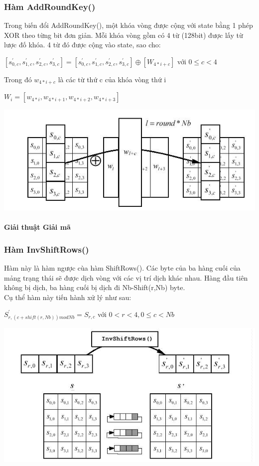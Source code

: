 \documentclass[paper=a4, fontsize=11pt]{scrartcl}	%
\numberwithin{equation}{section}															%
\numberwithin{figure}{section}																%
\numberwithin{table}{section}																%
\begin{document}
		\subsubsection{Hàm AddRoundKey()}
		Trong biến đổi AddRoundKey(), một khóa vòng được cộng với state bằng 1 phép XOR theo từng bit đơn giản. Mỗi khóa vòng gồm có 4 từ (128bit) được lấy từ lược đố khóa. 4 từ đó được cộng vào state, sao cho:
		\begin{center}
		$[s^{'}_{0,c},s^{'}_{1,c},s^{'}_{2,c},s^{'}_{3,c}] = [s^{'}_{0,c},s^{'}_{1,c},s^{'}_{2,c},s^{'}_{3,c}] \oplus [W_{4*i+c}]$ với $0 \le c < 4$
		\end{center}
		Trong đó $w_{4*i+c}$ là các từ thứ c của khóa vòng thứ i
		\begin{center}
		$W_{i} = [w_{4*i},w_{4*i+1},w_{4*i+2},w_{4*i+3}]$
		\end{center}
		\begin{center}
		\includegraphics[scale=0.5]{AESADDROUNDKEY}
		\end{center}
	\paragraph{Giải thuật Giải mã}
		\subsubsection{Hàm InvShiftRows()}
		Hàm này là hàm ngược cùa hàm ShiftRows(). Các byte của ba hàng cuối của mảng trạng thái sẽ được dịch vòng với các vị trí dịch khác nhau. Hàng đầu tiên không bị dịch, ba hàng cuối bị dịch đi Nb-Shift(r,Nb) byte.\\
		Cụ thể hàm này tiến hành xử lý như sau:
		\begin{center}
		$S^{'}_{r,(c+shift(r,Nb))mod Nb} = S_{r,c}$ với $ 0 < r < 4, 0 \le c < Nb$
		\end{center}
		\begin{center}
		\includegraphics[scale=0.7]{AESSHIFT}
		\end{center}
\end{document}
